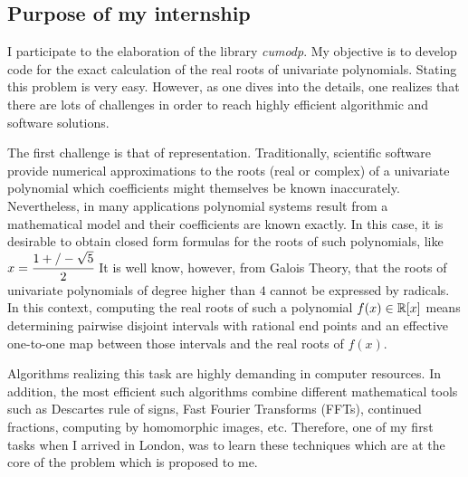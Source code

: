 \subsection{Purpose of my internship}

I participate to the elaboration of the library \textit{cumodp}. My objective is to develop code for the exact calculation of the real roots of  univariate polynomials. Stating this problem is very easy. However, as one dives into the details, one realizes that there are lots of challenges in order to reach highly efficient algorithmic and software solutions.

The first challenge is that of representation. Traditionally, scientific software provide numerical approximations to the roots (real or complex) 
of a univariate polynomial which coefficients might themselves 
be known inaccurately. Nevertheless, in many applications 
polynomial systems 
result from a mathematical model and their coefficients are known exactly.  In this case, it is desirable to obtain closed form formulas for the roots of such polynomials, like $x = \cfrac{1 +/- \sqrt{5}}{2}$
It is well know, however, from Galois Theory, that the roots of
univariate polynomials of degree higher than $4$ cannot
be expressed by radicals.
In this context,
computing the real roots of such a polynomial $f(x) \in {{\mathbb R}}[x]$ means
determining pairwise disjoint intervals with rational end points
and an effective one-to-one map between those intervals and 
the  real roots of $f(x)$.

Algorithms realizing this task are highly demanding in computer
resources. In addition, the most efficient such algorithms
combine different mathematical tools such as Descartes rule
of signs,  Fast Fourier Transforms (FFTs),
continued fractions, computing by homomorphic images, etc.
Therefore, one of my first tasks  when I arrived in London, 
was to learn these techniques which are at the core
of the problem which is proposed to me.

